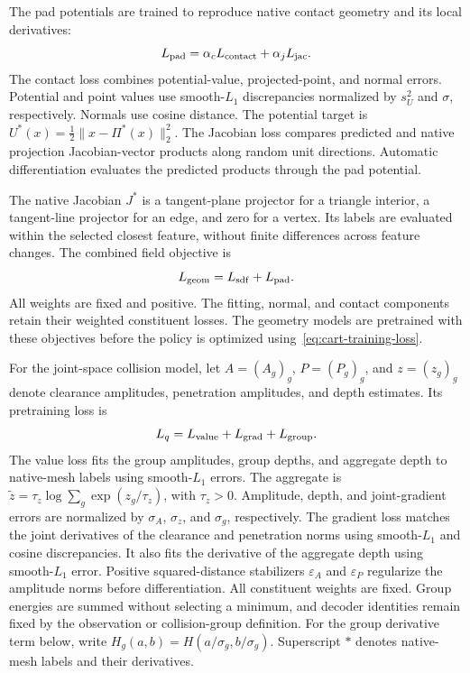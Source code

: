 The pad potentials are trained to reproduce native contact geometry and its local derivatives:
\begin{equation}
    L_{\rm pad}=\alpha_c L_{\rm contact}
                +\alpha_j L_{\rm jac}.
    \label{eq:cart-projection-supervision}
\end{equation}
The contact loss combines potential-value, projected-point, and normal errors. Potential and point values use smooth-$L_1$ discrepancies normalized by $s_U^2$ and $\sigma$, respectively. Normals use cosine distance. The potential target is $U^*(x)=\tfrac12\|x-\Pi^*(x)\|_2^2$. The Jacobian loss compares predicted and native projection Jacobian-vector products along random unit directions. Automatic differentiation evaluates the predicted products through the pad potential.

The native Jacobian $J^*$ is a tangent-plane projector for a triangle interior, a tangent-line projector for an edge, and zero for a vertex. Its labels are evaluated within the selected closest feature, without finite differences across feature changes. The combined field objective is
\begin{equation}
    L_{\rm geom}=L_{\rm sdf}+L_{\rm pad}.
    \label{eq:cart-geometry-loss}
\end{equation}
All weights are fixed and positive. The fitting, normal, and contact components retain their weighted constituent losses. The geometry models are pretrained with these objectives before the policy is optimized using~\eqref{eq:cart-training-loss}.

For the joint-space collision model, let $A=(A_g)_g$, $P=(P_g)_g$, and $z=(z_g)_g$ denote clearance amplitudes, penetration amplitudes, and depth estimates. Its pretraining loss is
\begin{equation}
    L_q=L_{\rm value}+L_{\rm grad}+L_{\rm group}.
    \label{eq:cart-q-supervision}
\end{equation}
The value loss fits the group amplitudes, group depths, and aggregate depth to native-mesh labels using smooth-$L_1$ errors. The aggregate is $\tilde z=\tau_z\log\sum_g\exp(z_g/\tau_z)$, with $\tau_z>0$. Amplitude, depth, and joint-gradient errors are normalized by $\sigma_A$, $\sigma_z$, and $\sigma_g$, respectively. The gradient loss matches the joint derivatives of the clearance and penetration norms using smooth-$L_1$ and cosine discrepancies. It also fits the derivative of the aggregate depth using smooth-$L_1$ error. Positive squared-distance stabilizers $\varepsilon_A$ and $\varepsilon_P$ regularize the amplitude norms before differentiation. All constituent weights are fixed. Group energies are summed without selecting a minimum, and decoder identities remain fixed by the observation or collision-group definition. For the group derivative term below, write $H_g(a,b)=H(a/\sigma_g,b/\sigma_g)$. Superscript $*$ denotes native-mesh labels and their derivatives.

